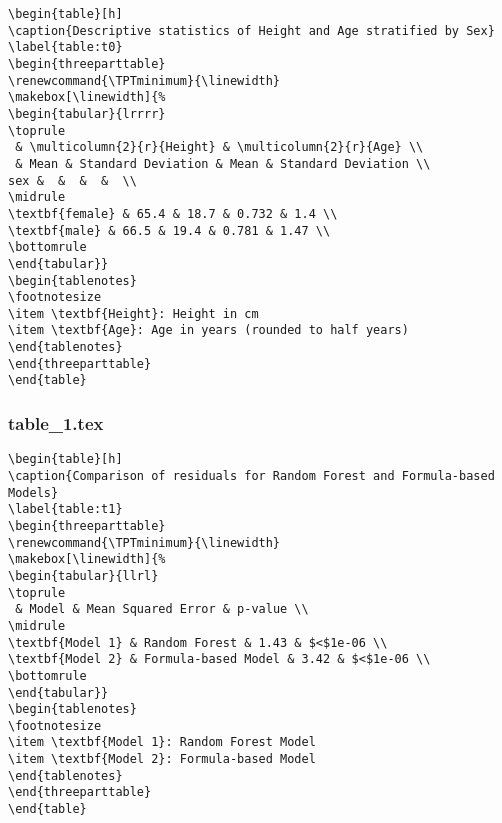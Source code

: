 \documentclass[11pt]{article}
\begin{document}
\begin{Verbatim}[tabsize=4]
\begin{table}[h]
\caption{Descriptive statistics of Height and Age stratified by Sex}
\label{table:t0}
\begin{threeparttable}
\renewcommand{\TPTminimum}{\linewidth}
\makebox[\linewidth]{%
\begin{tabular}{lrrrr}
\toprule
 & \multicolumn{2}{r}{Height} & \multicolumn{2}{r}{Age} \\
 & Mean & Standard Deviation & Mean & Standard Deviation \\
sex &  &  &  &  \\
\midrule
\textbf{female} & 65.4 & 18.7 & 0.732 & 1.4 \\
\textbf{male} & 66.5 & 19.4 & 0.781 & 1.47 \\
\bottomrule
\end{tabular}}
\begin{tablenotes}
\footnotesize
\item \textbf{Height}: Height in cm
\item \textbf{Age}: Age in years (rounded to half years)
\end{tablenotes}
\end{threeparttable}
\end{table}

\end{Verbatim}

\subsubsection*{table\_1.tex}

\begin{Verbatim}[tabsize=4]
\begin{table}[h]
\caption{Comparison of residuals for Random Forest and Formula-based Models}
\label{table:t1}
\begin{threeparttable}
\renewcommand{\TPTminimum}{\linewidth}
\makebox[\linewidth]{%
\begin{tabular}{llrl}
\toprule
 & Model & Mean Squared Error & p-value \\
\midrule
\textbf{Model 1} & Random Forest & 1.43 & $<$1e-06 \\
\textbf{Model 2} & Formula-based Model & 3.42 & $<$1e-06 \\
\bottomrule
\end{tabular}}
\begin{tablenotes}
\footnotesize
\item \textbf{Model 1}: Random Forest Model
\item \textbf{Model 2}: Formula-based Model
\end{tablenotes}
\end{threeparttable}
\end{table}

\end{Verbatim}
\end{document}
